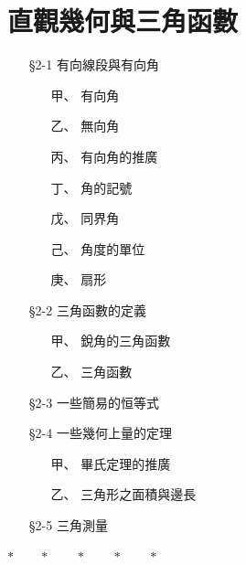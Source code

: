 
\section{直觀幾何與三角函數}
\label{sec:b3-ch2}

\begin{center}
\begin{minipage}{0.65\textwidth}
\begin{itemize}[leftmargin=2em, itemsep=0.3em]
  \item[§2-1] 有向線段與有向角
  \begin{itemize}[leftmargin=2em, itemsep=0.2em]
    \item[甲、] 有向角
    \item[乙、] 無向角
    \item[丙、] 有向角的推廣
    \item[丁、] 角的記號
    \item[戊、] 同界角
    \item[己、] 角度的單位
    \item[庚、] 扇形
  \end{itemize}
  \item[§2-2] 三角函數的定義
  \begin{itemize}[leftmargin=2em, itemsep=0.2em]
    \item[甲、] 銳角的三角函數
    \item[乙、] 三角函數
  \end{itemize}
  \item[§2-3] 一些簡易的恒等式
  \item[§2-4] 一些幾何上量的定理
  \begin{itemize}[leftmargin=2em, itemsep=0.2em]
    \item[甲、] 畢氏定理的推廣
    \item[乙、] 三角形之面積與邊長
  \end{itemize}
  \item[§2-5] 三角測量
\end{itemize}
\end{minipage}
\end{center}

\begin{center}
$* \qquad * \qquad * \qquad * \qquad *$
\end{center}


